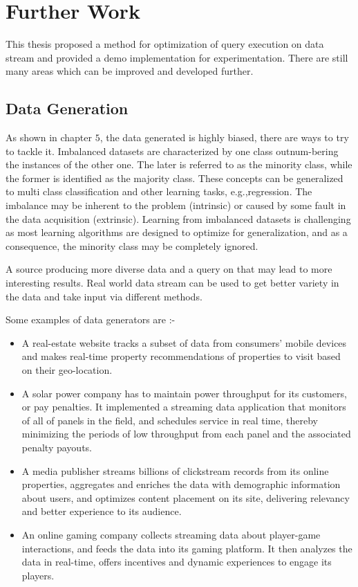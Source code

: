 \section{Further Work}
This thesis proposed a method for optimization of query execution on data stream and provided a demo implementation for experimentation. There are still many areas which can be improved and developed further.

\subsection{Data Generation}
As shown in chapter $5$, the data generated is highly biased, there are ways to try to tackle it\cite{Losing2018IncrementalOL}. Imbalanced datasets are characterized by one class outnum-bering the instances of the other one. The later is referred to as the minority class, while the former is identified as  the  majority class. These concepts can be generalized to  multi class classification  and  other  learning  tasks,  e.g.,regression.  The  imbalance  may  be  inherent  to  the problem (intrinsic) or caused by some fault in the data acquisition (extrinsic).  Learning from imbalanced datasets is challenging as most learning algorithms are designed to optimize for generalization, and as a consequence, the minority class may be completely ignored.\cite{DNN_for_stream} 
\par A source producing more diverse data and a query on that may lead to more interesting results. Real world data stream can be used to get better variety in the data and take input via different methods.
\par Some examples of data generators are :-
\begin{itemize}
    \item A real-estate website tracks a subset of data from consumers’ mobile devices and makes real-time property recommendations of properties to visit based on their geo-location.\cite{data_source}
    \item A solar power company has to maintain power throughput for its customers, or pay penalties. It implemented a streaming data application that monitors of all of panels in the field, and schedules service in real time, thereby minimizing the periods of low throughput from each panel and the associated penalty payouts. \cite{data_source}
    \item A media publisher streams billions of clickstream records from its online properties, aggregates and enriches the data with demographic information about users, and optimizes content placement on its site, delivering relevancy and better experience to its audience.\cite{data_source}
    \item An online gaming company collects streaming data about player-game interactions, and feeds the data into its gaming platform. It then analyzes the data in real-time, offers incentives and dynamic experiences to engage its players.\cite{data_source}
\end{itemize}

